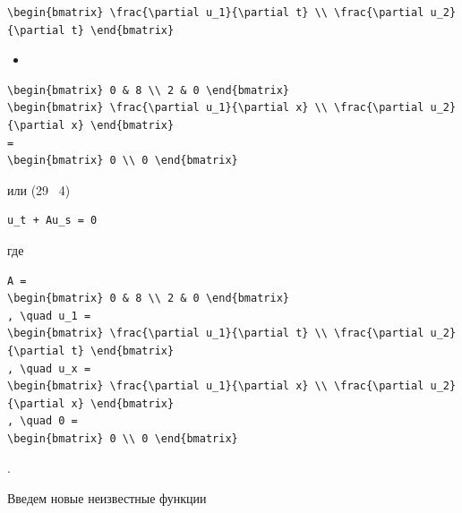 \documentclass[
  ukrainian,
]{article}
\providecommand{\tightlist}{%
  \setlength{\itemsep}{0pt}\setlength{\parskip}{0pt}}
\begin{document}
\begin{verbatim}
\begin{bmatrix} \frac{\partial u_1}{\partial t} \\ \frac{\partial u_2}{\partial t} \end{bmatrix}
\end{verbatim}

\begin{itemize}
\tightlist
\item
\end{itemize}

\begin{verbatim}
\begin{bmatrix} 0 & 8 \\ 2 & 0 \end{bmatrix}
\begin{bmatrix} \frac{\partial u_1}{\partial x} \\ \frac{\partial u_2}{\partial x} \end{bmatrix}
=
\begin{bmatrix} 0 \\ 0 \end{bmatrix}
\end{verbatim}

или (29 ~4)

\begin{verbatim}
u_t + Au_s = 0
\end{verbatim}

где

\begin{verbatim}
A =
\begin{bmatrix} 0 & 8 \\ 2 & 0 \end{bmatrix}
, \quad u_1 =
\begin{bmatrix} \frac{\partial u_1}{\partial t} \\ \frac{\partial u_2}{\partial t} \end{bmatrix}
, \quad u_x =
\begin{bmatrix} \frac{\partial u_1}{\partial x} \\ \frac{\partial u_2}{\partial x} \end{bmatrix}
, \quad 0 =
\begin{bmatrix} 0 \\ 0 \end{bmatrix}
\end{verbatim}

.

Введем новые неизвестные функции
\end{document}
